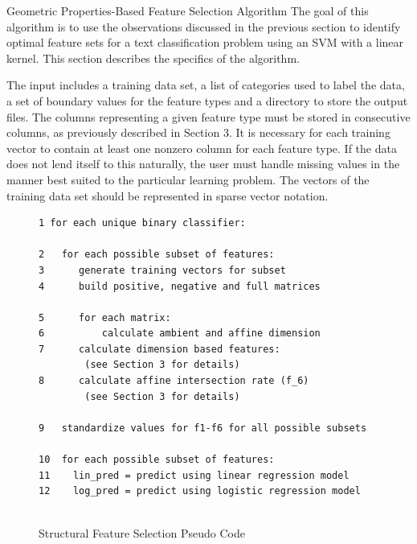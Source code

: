 \documentclass{llncs}
\begin{document}
\begin{section}{Geometric Properties-Based Feature Selection Algorithm}
The goal of this algorithm is to use the observations discussed in the previous section to identify optimal feature sets for a text classification problem using an SVM with a linear kernel. This section describes the specifics of the algorithm.

The input includes a training data set, a list of categories used to label the data, a set of boundary values for the feature types and a directory to store the output files. The columns representing a given feature type must be stored in consecutive columns, as  previously described in Section 3. It is necessary for each training vector to contain at least one nonzero column for each feature type. If the data does not lend itself to this naturally, the user must handle missing values in the manner best suited to the particular learning problem. The vectors of the training data set should be represented in sparse vector notation.

\begin{figure}[h]
\caption{Structural Feature Selection Pseudo Code}
\begin{lstlisting}
1 for each unique binary classifier:
			
2   for each possible subset of features:
3	   generate training vectors for subset
4	   build positive, negative and full matrices
		
5	   for each matrix:
6		   calculate ambient and affine dimension
7	   calculate dimension based features:
		(see Section 3 for details)
8	   calculate affine intersection rate (f_6)
		(see Section 3 for details)
		
9 	standardize values for f1-f6 for all possible subsets
	
10  for each possible subset of features:
11	  lin_pred = predict using linear regression model
12	  log_pred = predict using logistic regression model


\end{lstlisting}
\end{figure}
\end{section}
\end{document}
